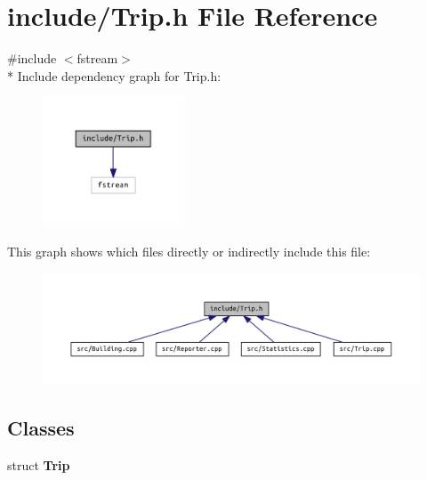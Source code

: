 \section{include/\+Trip.h File Reference}
\label{_trip_8h}
{\ttfamily \#include $<$fstream$>$}\\*
Include dependency graph for Trip.\+h\+:
\nopagebreak
\begin{figure}[H]
\begin{center}
\leavevmode
\includegraphics[width=119pt]{_trip_8h__incl}
\end{center}
\end{figure}
This graph shows which files directly or indirectly include this file\+:
\nopagebreak
\begin{figure}[H]
\begin{center}
\leavevmode
\includegraphics[width=350pt]{_trip_8h__dep__incl}
\end{center}
\end{figure}
\subsection*{Classes}
\begin{DoxyCompactItemize}
\item 
struct {\bf Trip}
\end{DoxyCompactItemize}
